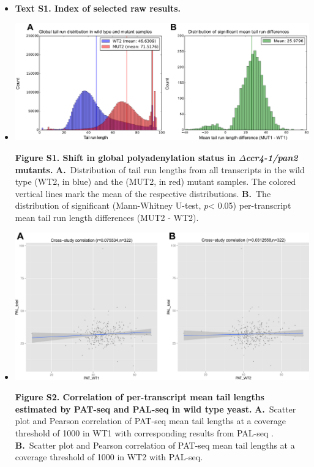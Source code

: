 \documentclass[10pt]{article}
\begin{document}
\begin{itemize}



	\item{\textbf{Text S1. Index of selected raw results.}}



\item[]{
\includegraphics[scale=0.8]{FigureS1.png}

\textbf{Figure S1. Shift in global polyadenylation status in \textit{$\Delta$ccr4-1/pan2} mutants.} \textbf{A.}~Distribution of tail run lengths from all transcripts in the wild type (WT2, in blue) and the (MUT2, in red) mutant samples. The colored vertical lines mark the mean of the respective distributions.
\textbf{B.}~The distribution of significant (Mann-Whitney U-test, $p$< 0.05) per-transcript mean tail run length differences (MUT2 - WT2).
}
	


\item[]{
\includegraphics[scale=0.8]{FigureS2.png}

\textbf{Figure S2. Correlation of per-transcript mean tail lengths estimated by PAT-seq and PAL-seq in wild type yeast.} \textbf{A.}~Scatter plot and Pearson correlation of PAT-seq mean tail lengths at a coverage threshold of 1000 in WT1 with corresponding results from PAL-seq \cite{subtelny14}. \textbf{B.}~Scatter plot and Pearson correlation of PAT-seq mean tail lengths at a coverage threshold of 1000 in WT2 with PAL-seq.}




\end{itemize}
\end{document}
